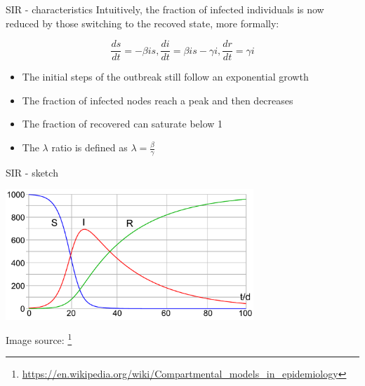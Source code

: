 \documentclass[a4paper,11pt]{book}
\begin{document}
\begin{textbox}{SIR - characteristics}
Intuitively, the fraction of infected individuals is now reduced by those switching to the recoved state, more formally:

\[
\frac{ds}{dt}=-\beta i s ,
\frac{di}{dt}=\beta i s- \gamma i,
\frac{dr}{dt}= \gamma i
\]

\begin{itemize}
    \item The initial steps of the outbreak still follow an exponential growth
    \item The fraction of infected nodes reach a peak and then decreases
    \item The fraction of recovered can saturate below 1
    \item The $\lambda$ ratio is defined as $\lambda=\frac{\beta}{\gamma}$
\end{itemize}


\end{textbox}



\begin{textbox}{SIR - sketch}


\centering
\colorbox{white}{\includegraphics[width=0.7\textwidth]{pics/SIR-Modell.pdf}}

Image source: \footnote{\url{https://en.wikipedia.org/wiki/Compartmental_models_in_epidemiology}}


\end{textbox}
\end{document}
